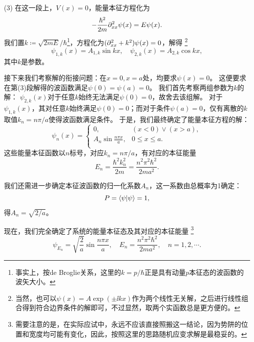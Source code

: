 (3) 在这一段上，$V(x)=0$，能量本征方程化为
\begin{equation}
    -\frac{\hbar^2}{2m} \partial_{xx}^2 \psi(x) = E \psi(x).
\end{equation}
我们置$k\coloneq \sqrt{2mE}/\hbar$\footnote{事实上，按de Broglie关系，这里的$k=p/\hbar$正是具有动量$p$本征态的波函数的波矢大小。}，方程化为$(\partial_{xx}^2+k^2) \psi(x) = 0$，解得
\footnote{当然，也可以$\psi(x)=A\exp(\pm\ii k x)$作为两个线性无关解，之后进行线性组合得到符合边界条件的解即可，不过显然，取两个实函数总是更方便的。}
\begin{equation}
    \psi_{1,k}(x) = A_{1,k} \sin kx ,\quad \psi_{2,k}(x) = A_{2,k} \cos kx,
\end{equation}
其中$k$是参数。

接下来我们考察解的衔接问题：在$x=0, x=a$处，均要求$\psi(x)=0$。
这便要求在第(3)段解得的波函数满足$\psi(0)=\psi(a)=0$。
我们首先考察两组参数为$k$的解：
$\psi_{2,k}(x)$对于任意$k$始终无法满足$\psi(0)=0$，故舍去该组解。
对于$\psi_{1,k}(x)$，其对任意$k$始终满足$\psi(0)=0$；而对于条件$\psi(a)=0$，仅有离散的$k$取值$k_n=n\pi/a$使得波函数满足条件。
于是，我们最终确定了能量本征方程的解：
\begin{equation}
    \psi_n(x) =
    \begin{cases}
        0,                          & (x<0)\vee(x>a),  \\
        A_n \sin\frac{n\pi x}{a},   & 0 \leq x \leq a.\\
    \end{cases}
\end{equation}
这些能量本征函数以$n$标号，对应$k_n=n\pi/a$，有对应的本征能量
\begin{equation}
    E_n = \frac{\hbar^2 k_n^2}{2m} = \frac{n^2 \pi^2 \hbar^2}{2m a^2}.
\end{equation}

我们还需进一步确定本征波函数的归一化系数$A_n$，这一系数由总概率为1确定：
\begin{equation}
    P = \braket{\psi}{\psi} = 1,
\end{equation}
得$A_n = \sqrt{2/a}$。

现在，我们完全确定了系统的能量本征态及其对应的本征能量
\footnote{需要注意的是，在实际应试中，永远不应该直接照搬这一结论，因为势阱的位置和宽度均可能有变化，因此，按照这里的思路随机应变求解是最稳妥的。}
\begin{equation}
    \psi_{E_n} = \sqrt{\frac2a} \sin\frac{n\pi x}{a} ,\quad E_n = \frac{n^2 \pi^2 \hbar^2}{2m a^2}, \quad n=1,2,\cdots.
\end{equation}

